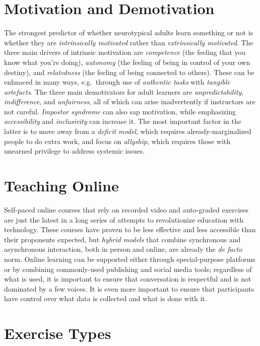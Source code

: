 \documentclass{article}
\begin{document}
\section{Motivation and Demotivation}

The strongest predictor of whether neurotypical adults learn something or not
is whether they are \emph{intrinsically motivated} rather than \emph{extrinsically motivated}.
The three main drivers of intrinsic motivation are
\emph{competence} (the feeling that you know what you're doing),
\emph{autonomy} (the feeling of being in control of your own destiny),
and \emph{relatedness} (the feeling of being connected to others).
These can be enhnaced in many ways,
e.g.\ through use of \emph{authentic tasks} with \emph{tangible artefacts}.
The three main demotivators for adult learners are \emph{unpredictability},
\emph{indifference},
and \emph{unfairness},
all of which can arise inadvertently if instructors are not careful.
\emph{Impostor syndrome} can also sap motivation,
while emphasizing \emph{accessibility} and \emph{inclusivity} can increase it.
The most important factor in the latter is to move away from a \emph{deficit model},
which requires already-marginalized people to do extra work,
and focus on \emph{allyship},
which requires those with unearned privilege to address systemic issues.

\section{Teaching Online}

Self-paced online courses that rely on recorded video and auto-graded exercises
are just the latest in a long series of attempts to revolutionize education with technology.
These courses have proven to be less effective and less accessible than their proponents expected,
but \emph{hybrid models} that combine synchronous and asynchronous interaction,
both in person and online,
are already the \emph{de facto} norm.
Online learning can be supported either through special-purpose platforms
or by combining commonly-used publishing and social media tools;
regardless of what is used,
it is important to ensure that conversation is respectful and is not dominated by a few voices.
It is even more important to ensure that participants have control over
what data is collected and what is done with it.

\section{Exercise Types}
\end{document}
